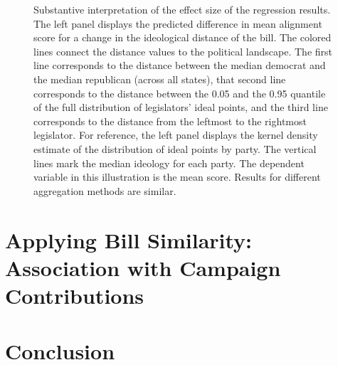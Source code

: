 \documentclass[12pt]{article} %
\begin{document}
\begin{figure}[H]%
\centering
{}
\caption{Substantive interpretation of the effect size of the regression results. The left panel displays the predicted difference in mean alignment score for a change in the ideological distance of the bill. The colored lines connect the distance values to the political landscape. The first line corresponds to the distance between the median democrat and the median republican (across all states), that second line corresponds to the distance between the 0.05 and the 0.95 quantile of the full distribution of legislators' ideal points, and the third line corresponds to the distance from the leftmost to the rightmost legislator. For reference, the left panel displays the kernel density estimate of the distribution of ideal points by party. The vertical lines mark the median ideology for each party. The dependent variable in this illustration is the mean score. Results for different aggregation methods are similar. }
\label{fig:ideo_interpret}
\end{figure}

\section{Applying Bill Similarity: Association with Campaign Contributions}

\section{Conclusion}
\end{document}
